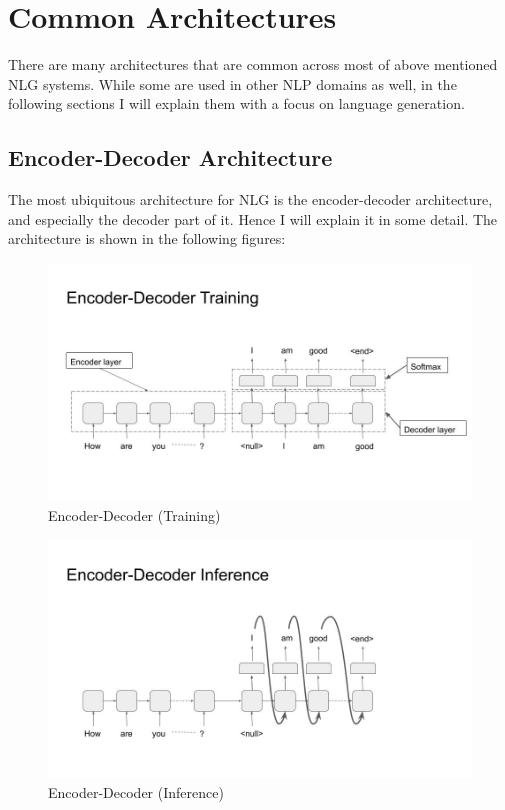 \documentclass[]{krantz}
\begin{document}
\hypertarget{common-architectures}{%
\section{Common Architectures}\label{common-architectures}}

There are many architectures that are common across most of above mentioned NLG systems. While some are used in other NLP domains as well, in the following sections I will explain them with a focus on language generation.

\hypertarget{encoder-decoder-architecture}{%
\subsection{Encoder-Decoder Architecture}\label{encoder-decoder-architecture}}

The most ubiquitous architecture for NLG is the encoder-decoder architecture, and especially the decoder part of it. Hence I will explain it in some detail. The architecture is shown in the following figures:

\begin{figure}
\centering
\includegraphics{figures/04-01-use-case1/encoder_decoder_trg.jpg}
\caption{Encoder-Decoder (Training)}
\end{figure}

\begin{figure}
\centering
\includegraphics{figures/04-01-use-case1/encoder_decoder_inf.jpg}
\caption{Encoder-Decoder (Inference)}
\end{figure}
\end{document}
